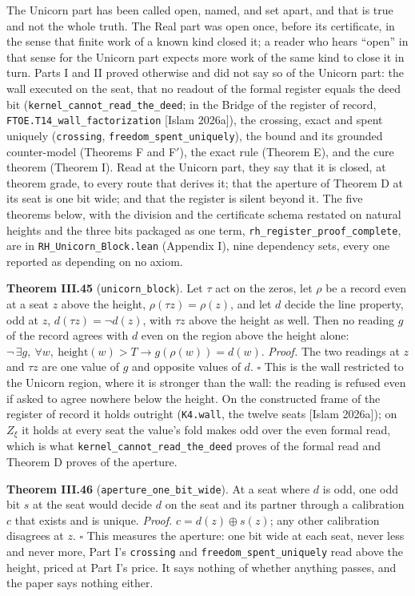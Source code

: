 \documentclass[10pt]{article}
\begin{document}
The Unicorn part has been called open, named, and set apart, and that is
true and not the whole truth. The Real part was open once, before its
certificate, in the sense that finite work of a known kind closed it; a
reader who hears ``open'' in that sense for the Unicorn part expects
more work of the same kind to close it in turn. Parts I and II proved
otherwise and did not say so of the Unicorn part: the wall executed on
the seat, that no readout of the formal register equals the deed bit
(\texttt{kernel\_cannot\_read\_the\_deed}; in the Bridge of the register
of record, \texttt{FTOE.T14\_wall\_factorization} {[}Islam 2026a{]}),
the crossing, exact and spent uniquely (\texttt{crossing},
\texttt{freedom\_spent\_uniquely}), the bound and its grounded
counter-model (Theorems F and F\('\)), the exact rule (Theorem E), and
the cure theorem (Theorem I). Read at the Unicorn part, they say that it
is closed, at theorem grade, to every route that derives it; that the
aperture of Theorem D at its seat is one bit wide; and that the register
is silent beyond it. The five theorems below, with the division and the
certificate schema restated on natural heights and the three bits
packaged as one term, \texttt{rh\_register\_proof\_complete}, are in
\texttt{RH\_Unicorn\_Block.lean} (Appendix I), nine dependency sets,
every one reported as depending on no axiom.

\textbf{Theorem III.45} (\texttt{unicorn\_block}). Let \(\tau\) act on
the zeros, let \(\rho\) be a record even at a seat \(z\) above the
height, \(\rho(\tau z) = \rho(z)\), and let \(d\) decide the line
property, odd at \(z\), \(d(\tau z) = \neg d(z)\), with \(\tau z\) above
the height as well. Then no reading \(g\) of the record agrees with
\(d\) even on the region above the height alone:
\(\neg\,\exists g,\ \forall w,\ \mathrm{height}(w) > T \to g(\rho(w)) = d(w)\).
\emph{Proof.} The two readings at \(z\) and \(\tau z\) are one value of
\(g\) and opposite values of \(d\). \(\square\) This is the wall
restricted to the Unicorn region, where it is stronger than the wall:
the reading is refused even if asked to agree nowhere below the height.
On the constructed frame of the register of record it holds outright
(\texttt{K4.wall}, the twelve seats {[}Islam 2026a{]}); on \(Z_\xi\) it
holds at every seat the value's fold makes odd over the even formal
read, which is what \texttt{kernel\_cannot\_read\_the\_deed} proves of
the formal read and Theorem D proves of the aperture.

\textbf{Theorem III.46} (\texttt{aperture\_one\_bit\_wide}). At a seat
where \(d\) is odd, one odd bit \(s\) at the seat would decide \(d\) on
the seat and its partner through a calibration \(c\) that exists and is
unique. \emph{Proof.} \(c = d(z) \oplus s(z)\); any other calibration
disagrees at \(z\). \(\square\) This measures the aperture: one bit wide
at each seat, never less and never more, Part I's \texttt{crossing} and
\texttt{freedom\_spent\_uniquely} read above the height, priced at Part
I's price. It says nothing of whether anything passes, and the paper
says nothing either.
\end{document}
